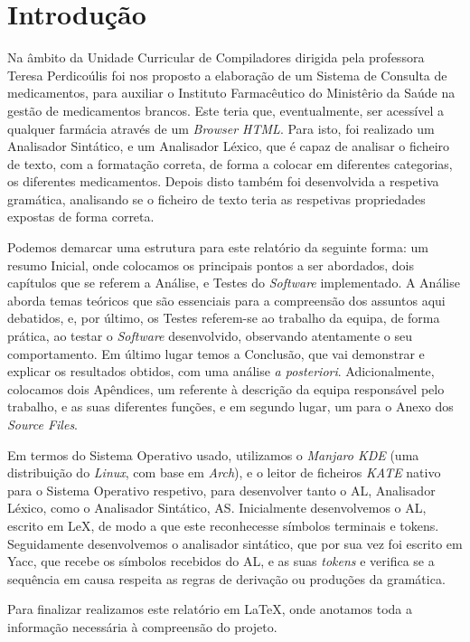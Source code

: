 \documentclass{article}
\begin{document}
\vspace*{2cm} \Large\tableofcontents \vspace*{\fill}
\thispagestyle{empty}
\setcounter{page}{0}
\pagebreak

\vspace{1cm}
\large\section{Introdução}

\hspace*{1.5em}Na âmbito da Unidade Curricular de Compiladores dirigida pela professora Teresa Perdicoúlis foi nos proposto a elaboração de um Sistema de Consulta de medicamentos, para auxiliar o Instituto Farmacêutico do Ministêrio da Saúde na gestão de medicamentos brancos. Este teria que, eventualmente, ser acessível a qualquer farmácia através de um \emph{Browser HTML}. Para isto, foi realizado um Analisador Sintático, e um Analisador Léxico, que é capaz de analisar o ficheiro de texto, com a formatação correta, de forma a colocar em diferentes categorias, os diferentes medicamentos. Depois disto também foi desenvolvida a respetiva gramática, analisando se o ficheiro de texto teria as respetivas propriedades expostas de forma correta. 
\par \hspace*{1.5em}Podemos demarcar uma estrutura para este relatório da seguinte forma: um resumo Inicial, onde colocamos os principais pontos a ser abordados, dois capítulos que se referem a Análise, e Testes do \textit{Software} implementado. A Análise aborda temas teóricos que são essenciais para a compreensão dos assuntos aqui debatidos, e, por último, os Testes referem-se ao trabalho da equipa, de forma prática, ao testar o \emph{Software} desenvolvido, observando atentamente o seu comportamento. Em último lugar temos a Conclusão, que vai demonstrar e explicar os resultados obtidos, com uma análise \emph{a posteriori}. Adicionalmente, colocamos dois Apêndices, um referente à descrição da equipa responsável pelo trabalho, e as suas diferentes funções, e em segundo lugar, um para o Anexo dos \emph{Source Files}.



\par \hspace*{1.5em}Em termos do Sistema Operativo usado, utilizamos o \emph{Manjaro KDE} (uma distribuição do \emph{Linux}, com base em \emph{Arch}), e o leitor de ficheiros \emph{KATE} nativo para o Sistema Operativo respetivo, para desenvolver tanto o AL, Analisador Léxico, como o Analisador Sintático, AS. Inicialmente desenvolvemos o AL, escrito em LeX, de modo a que este reconhecesse símbolos terminais e tokens. Seguidamente desenvolvemos o analisador sintático, que por sua vez foi escrito em Yacc, que recebe os símbolos recebidos do AL, e as suas \emph{tokens} e verifica se a sequência em causa respeita as regras de derivação ou produções da gramática. 
\par \hspace*{1.5em}Para finalizar realizamos este relatório em LaTeX, onde anotamos toda a informação necessária à compreensão do projeto.
\end{document}
